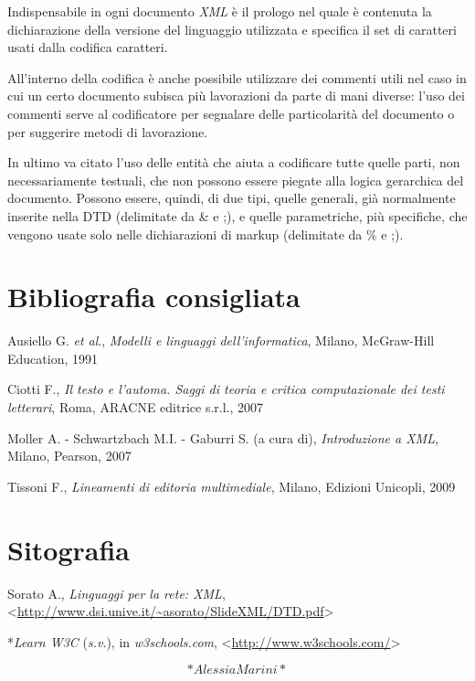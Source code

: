 \documentclass[
  b5paper,
  twoside,
  11pt,
  chapterprefix=false,
  bibliography=totocnumbered,
  listof=flat]{scrbook}
\begin{document}
Indispensabile in ogni documento \emph{XML} è il prologo nel quale è
contenuta la dichiarazione della versione del linguaggio utilizzata e
specifica il set di caratteri usati dalla codifica caratteri.

All'interno della codifica è anche possibile utilizzare dei commenti
utili nel caso in cui un certo documento subisca più lavorazioni da
parte di mani diverse: l'uso dei commenti serve al codificatore per
segnalare delle particolarità del documento o per suggerire metodi di
lavorazione.

In ultimo va citato l'uso delle entità che aiuta a codificare tutte
quelle parti, non necessariamente testuali, che non possono essere
piegate alla logica gerarchica del documento. Possono essere, quindi, di
due tipi, quelle generali, già normalmente inserite nella DTD
(delimitate da \& e ;), e quelle parametriche, più specifiche, che
vengono usate solo nelle dichiarazioni di markup (delimitate da \% e ;).

\hypertarget{bibliografia-consigliata-27}{%
\section*{Bibliografia consigliata}\label{bibliografia-consigliata-27}}

Ausiello G. \emph{et al}., \emph{Modelli e linguaggi dell'informatica}, Milano,
McGraw-Hill Education, 1991

Ciotti F., \emph{Il testo e l'automa. Saggi di teoria e critica
computazionale dei testi letterari}, Roma, ARACNE editrice s.r.l., 2007

Moller A. - Schwartzbach M.I. - Gaburri S. (a cura di), \emph{Introduzione a
XML}, Milano, Pearson, 2007

Tissoni F., \emph{Lineamenti di editoria multimediale}, Milano, Edizioni
Unicopli, 2009

\hypertarget{sitografia-32}{%
\section*{Sitografia}\label{sitografia-32}}

Sorato A., \emph{Linguaggi per la rete: XML},
\textless{}{\url{http://www.dsi.unive.it/~asorato/SlideXML/DTD.pdf}\textgreater{}}

*\emph{Learn W3C} (\emph{s.v}.), in \emph{w3schools.com},
\textless{}{\url{http://www.w3schools.com/}\textgreater{}}

\[*Alessia Marini*\]

\backmatter
\end{document}
